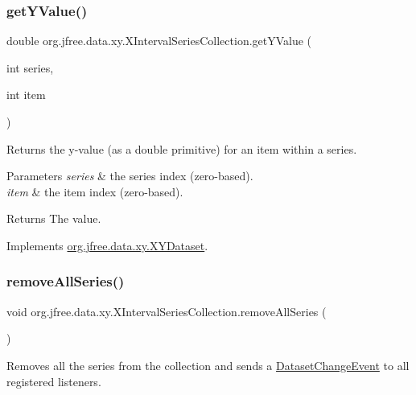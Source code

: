 \subsubsection{\texorpdfstring{get\+Y\+Value()}{getYValue()}}
{\footnotesize\ttfamily double org.\+jfree.\+data.\+xy.\+X\+Interval\+Series\+Collection.\+get\+Y\+Value (\begin{DoxyParamCaption}\item[{int}]{series,  }\item[{int}]{item }\end{DoxyParamCaption})}

Returns the y-\/value (as a double primitive) for an item within a series.


\begin{DoxyParams}{Parameters}
{\em series} & the series index (zero-\/based). \\
\hline
{\em item} & the item index (zero-\/based).\\
\hline
\end{DoxyParams}
\begin{DoxyReturn}{Returns}
The value. 
\end{DoxyReturn}


Implements \mbox{\hyperlink{interfaceorg_1_1jfree_1_1data_1_1xy_1_1_x_y_dataset_a5e86389417eb5ed7b663a952ca370914}{org.\+jfree.\+data.\+xy.\+X\+Y\+Dataset}}.

\mbox{\label{classorg_1_1jfree_1_1data_1_1xy_1_1_x_interval_series_collection_a7cd0071751dd1010ae0aefb2443b3f3a}} 
\subsubsection{\texorpdfstring{remove\+All\+Series()}{removeAllSeries()}}
{\footnotesize\ttfamily void org.\+jfree.\+data.\+xy.\+X\+Interval\+Series\+Collection.\+remove\+All\+Series (\begin{DoxyParamCaption}{ }\end{DoxyParamCaption})}

Removes all the series from the collection and sends a \mbox{\hyperlink{}{Dataset\+Change\+Event}} to all registered listeners.

